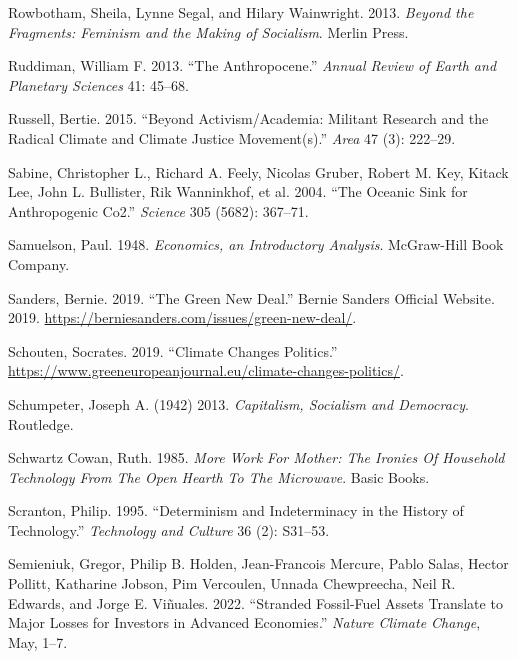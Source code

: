 \documentclass[a4paper, nobind]{templates/ociamthesis}
\newlength{\cslhangindent}
\newenvironment{CSLReferences}[2] %
 {%
  \setlength{\parindent}{0pt}
  \ifodd #1
  \let\oldpar\par
  \def\par{\hangindent=\cslhangindent\oldpar}
  \fi
  \setlength{\parskip}{1mm}
  \setlength{\baselineskip}{6mm}
 }%
 {}
\begin{document}
\begin{CSLReferences}{1}{0}
\leavevmode{}%
Rowbotham, Sheila, Lynne Segal, and Hilary Wainwright. 2013. \emph{Beyond the Fragments: {Feminism} and the Making of Socialism}. {Merlin Press}.

\leavevmode{}%
Ruddiman, William F. 2013. {``The Anthropocene.''} \emph{Annual Review of Earth and Planetary Sciences} 41: 45--68.

\leavevmode{}%
Russell, Bertie. 2015. {``Beyond Activism/Academia: Militant Research and the Radical Climate and Climate Justice Movement(s).''} \emph{Area} 47 (3): 222--29.

\leavevmode{}%
Sabine, Christopher L., Richard A. Feely, Nicolas Gruber, Robert M. Key, Kitack Lee, John L. Bullister, Rik Wanninkhof, et al. 2004. {``The {Oceanic Sink} for {Anthropogenic Co2}.''} \emph{Science} 305 (5682): 367--71.

\leavevmode{}%
Samuelson, Paul. 1948. \emph{Economics, an {Introductory Analysis}}. {McGraw-Hill Book Company}.

\leavevmode{}%
Sanders, Bernie. 2019. {``The {Green New Deal}.''} {Bernie Sanders Official Website}. 2019. \url{https://berniesanders.com/issues/green-new-deal/}.

\leavevmode{}%
Schouten, Socrates. 2019. {``Climate {Changes Politics}.''} \url{https://www.greeneuropeanjournal.eu/climate-changes-politics/}.

\leavevmode{}%
Schumpeter, Joseph A. (1942) 2013. \emph{Capitalism, {Socialism} and {Democracy}}. {Routledge}.

\leavevmode{}%
Schwartz Cowan, Ruth. 1985. \emph{More {Work For Mother}: {The Ironies Of Household Technology From The Open Hearth To The Microwave}}. {Basic Books}.

\leavevmode{}%
Scranton, Philip. 1995. {``Determinism and {Indeterminacy} in the {History} of {Technology}.''} \emph{Technology and Culture} 36 (2): S31--53.

\leavevmode{}%
Semieniuk, Gregor, Philip B. Holden, Jean-Francois Mercure, Pablo Salas, Hector Pollitt, Katharine Jobson, Pim Vercoulen, Unnada Chewpreecha, Neil R. Edwards, and Jorge E. Viñuales. 2022. {``Stranded Fossil-Fuel Assets Translate to Major Losses for Investors in Advanced Economies.''} \emph{Nature Climate Change}, May, 1--7.


\end{CSLReferences}
\end{document}
